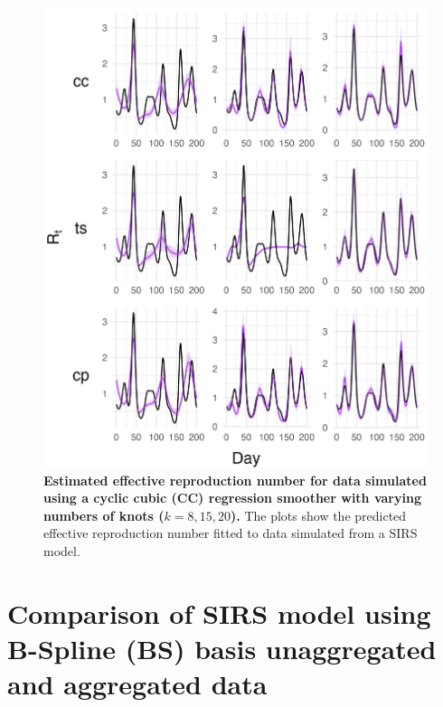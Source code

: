\documentclass[
11pt, %
oneside, %
english, %
singlespacing, %
]{macthesis} %
\begin{document}
\begin{figure}
\centering
\includegraphics[width=\textwidth]{figure/Simulated/simulation_cc_20_k(8,15,20)_bsd2_beta2_plot_R_t.png}
\caption[Estimated Simulated Data (CC) Effective Reproduction Number]{\textbf{Estimated effective reproduction number for data simulated using a cyclic cubic (CC) regression smoother with varying numbers of knots (\(k = 8, 15, 20\)).} The plots show the predicted effective reproduction number fitted to data simulated from a SIRS model.}
\label{fig:Rt20cc}
\end{figure}

\section{Comparison of SIRS model using B-Spline (BS) basis unaggregated and aggregated data}\label{Appendix-results-agg}
\end{document}
